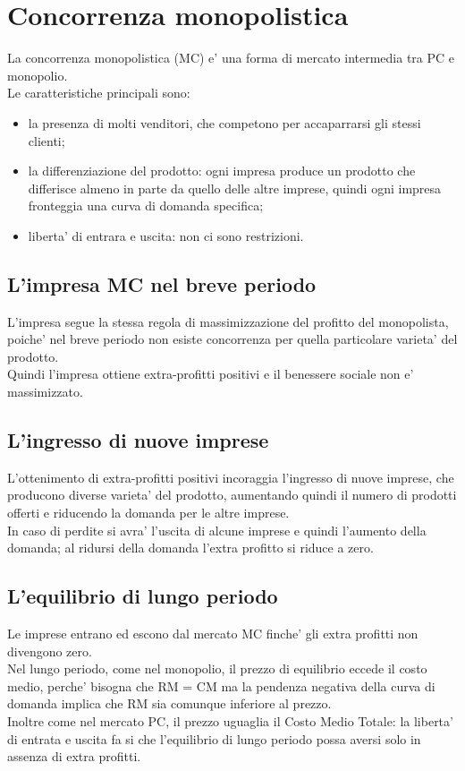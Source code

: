 \documentclass{report}
\begin{document}
	\section{Concorrenza monopolistica}
	La concorrenza monopolistica (MC) e' una forma di mercato intermedia tra PC e monopolio.
	\medskip \\Le caratteristiche principali sono:
	\begin{itemize}
		\item la presenza di molti venditori, che competono per accaparrarsi gli stessi clienti;
		\item la differenziazione del prodotto: ogni impresa produce un prodotto che differisce almeno in parte da quello delle altre imprese, quindi ogni impresa fronteggia una curva di domanda specifica;
		\item liberta' di entrara e uscita: non ci sono restrizioni.
	\end{itemize}
	\subsection{L'impresa MC nel breve periodo}
	L'impresa segue la stessa regola di massimizzazione del profitto del monopolista, poiche' nel breve periodo non esiste concorrenza per quella particolare varieta' del prodotto.
	\medskip \\Quindi l'impresa ottiene extra-profitti positivi e il benessere sociale non e' massimizzato.
	\subsection{L'ingresso di nuove imprese}
	L'ottenimento di extra-profitti positivi incoraggia l'ingresso di nuove imprese, che producono diverse varieta' del prodotto, aumentando quindi il numero di prodotti offerti e riducendo la domanda per le altre imprese.\medskip \\In caso di perdite si avra' l'uscita di alcune imprese e quindi l'aumento della domanda; al ridursi della domanda l'extra profitto si riduce a zero.
	\subsection{L'equilibrio di lungo periodo}
	Le imprese entrano ed escono dal mercato MC finche' gli extra profitti non divengono zero.\medskip \\
	Nel lungo periodo, come nel monopolio, il prezzo di equilibrio eccede il costo medio, perche' bisogna che RM = CM ma la pendenza negativa della curva di domanda implica che RM sia comunque inferiore al prezzo.\medskip \\Inoltre come nel mercato PC, il prezzo uguaglia il Costo Medio Totale: la liberta' di entrata e uscita fa si che l'equilibrio di lungo periodo possa aversi solo in assenza di extra profitti.
\end{document}
